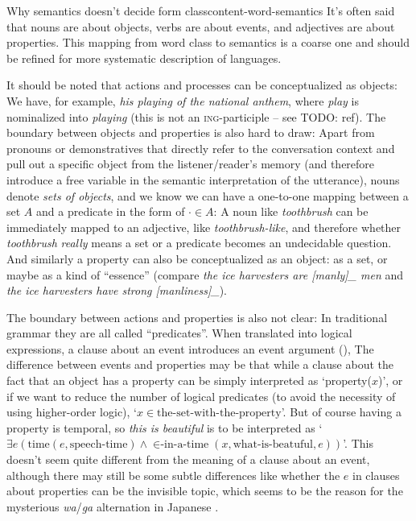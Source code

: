 \documentclass[UTF8, a4paper, oneside, scheme=plain]{ctexrep}
\newcommand{\corpus}[1]{\emph{#1}}
\newcommand{\corpuscat}[1]{\textsc{#1}}
\newcommand{\translate}[1]{`#1'}
\begin{document}
\begin{theorybox}{Why semantics doesn't decide form class}{content-word-semantics}
    It's often said that nouns are about objects, 
    verbs are about events,
    and adjectives are about properties.
    This mapping from word class to semantics is a coarse one 
    and should be refined for more systematic description of languages.

    It should be noted that actions and processes can be conceptualized as objects:
    We have, for example, \corpus{his playing of the national anthem},
    where \corpus{play} is nominalized into \corpus{playing}
    (this is not an \corpuscat{ing}-participle -- see TODO: ref).
    The boundary between objects and properties is also hard to draw:
    Apart from pronouns or demonstratives 
    that directly refer to the conversation context 
    and pull out a specific object from the listener/reader's memory
    (and therefore introduce a free variable in the semantic interpretation of the utterance),
    nouns denote \emph{sets of objects},
    and we know we can have a one-to-one mapping 
    between a set $A$ and a predicate in the form of $\cdot \in A$:
    A noun like \corpus{toothbrush} 
    can be immediately mapped to an adjective, like \corpus{toothbrush-like},
    and therefore whether \corpus{toothbrush} \emph{really} means 
    a set or a predicate becomes an undecidable question.
    And similarly a property can also be conceptualized as an object: 
    as a set, or maybe as a kind of ``essence''
    (compare \corpus{the ice harvesters are [manly]_{} men}
    and \corpus{the ice harvesters have strong [manliness]_{\text{object?}}}).

    The boundary between actions and properties is also not clear:
    In traditional grammar they are all called ``predicates''.
    When translated into logical expressions,
    a clause about an event introduces an event argument (),
    The difference between events and properties may be that
    while a clause about the fact that an object has a property 
    can be simply interpreted as \translate{property($x$)},
    or if we want to reduce the number of logical predicates 
    (to avoid the necessity of using higher-order logic),
    \translate{$x \in \text{the-set-with-the-property}$}.
    But of course having a property is temporal,
    so \corpus{this is beautiful} is to be interpreted as 
    \translate{$\exists e (\text{time}(e, \text{speech-time}) \land 
    \text{$\in$-in-a-time}(x, \text{what-is-beatuful}, e) )$}.
    This doesn't seem quite different from the meaning of a clause about an event,
    although there may still be some subtle differences like 
    whether the $e$ in clauses about properties can be the invisible topic, 
    which seems to be the reason for the mysterious \corpus{wa}/\corpus{ga} alternation in Japanese
    \citep{heycock2008}.


\end{theorybox}
\end{document}
